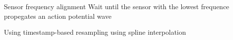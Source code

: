 \begin{frame}[allowframebreaks]{Sensor frequency alignment}
    Wait until the sensor with the lowest frequence propegates an action potential wave
    
    Using timestamp-based resampling using spline interpolation \cite{lovegrove-2013-spline-fusion-a-continuous-time-representation-for-visual-inertial-fusion-with-application-to-rolling-shutter-cameras}

\end{frame}